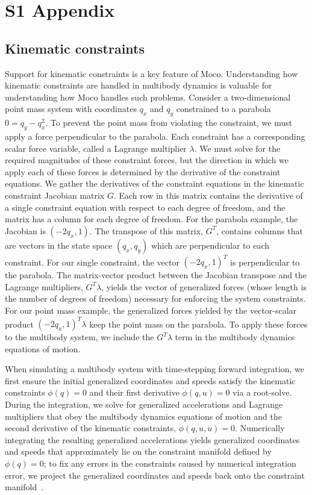 \documentclass[10pt,letterpaper]{article}
\begin{document}
\section*{S1 Appendix}

\subsection*{Kinematic constraints}

Support for kinematic constraints is a key feature of Moco. Understanding how kinematic constraints are handled in multibody dynamics is valuable for understanding how Moco handles such problems. Consider a two-dimensional point mass system with coordinates $q_x$ and $q_y$ constrained to a parabola $0 = q_y - q_x^2$. To prevent the point mass from violating the constraint, we must apply a force perpendicular to the parabola. Each constraint has a corresponding scalar force variable, called a Lagrange multiplier $\lambda$. We must solve for the required magnitudes of these constraint forces, but the direction in which we apply each of these forces is determined by the derivative of the constraint equations. We gather the derivatives of the constraint equations in the kinematic constraint Jacobian matrix $G$. Each row in this matrix contains the derivative of a single constraint equation with respect to each degree of freedom, and the matrix has a column for each degree of freedom. For the parabola example, the Jacobian is $( -2q_x, 1)$. The transpose of this matrix, $G^T$, contains columns that are vectors in the state space $(q_x, q_y)$ which are perpendicular to each constraint. For our single constraint, the vector $(-2q_x, 1)^T$ is perpendicular to the parabola. The matrix-vector product between the Jacobian transpose and the Lagrange multipliers, $G^T \lambda$, yields the vector of generalized forces (whose length is the number of degrees of freedom) necessary for enforcing the system constraints. For our point mass example, the generalized forces yielded by the vector-scalar product  $(-2q_x, 1)^T \lambda$ keep the point mass on the parabola. To apply these forces to the multibody system, we include the $G^T \lambda$ term in the multibody dynamics equations of motion.

When simulating a multibody system with time-stepping forward integration, we first ensure the initial generalized coordinates and speeds satisfy the kinematic constraints $\phi(q) = 0$ and their first derivative $\dot{\phi}(q, u) = 0$ via a root-solve. During the integration, we solve for generalized accelerations and Lagrange multipliers that obey the multibody dynamics equations of motion and the second derivative of the kinematic constraints, $\ddot{\phi}(q, u, \dot{u}) = 0$. Numerically integrating the resulting generalized accelerations yields generalized coordinates and speeds that approximately lie on the constraint manifold defined by $\phi(q) = 0$; to fix any errors in the constraints caused by numerical integration error, we project the generalized coordinates and speeds back onto the constraint manifold~\cite{Sherman:2011byc}.
\end{document}

